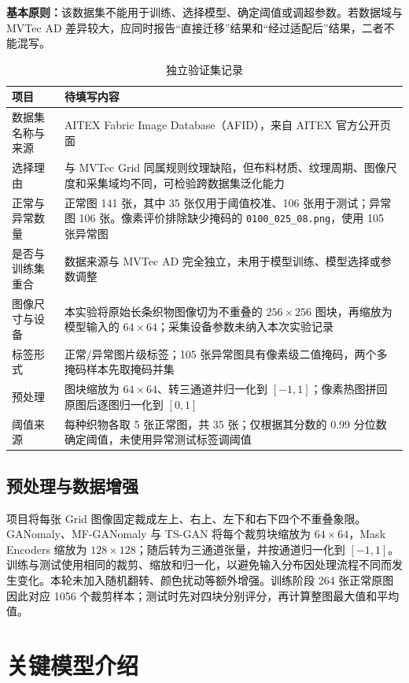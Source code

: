 \documentclass[UTF8,12pt]{ctexart}
\begin{document}
\noindent\textbf{基本原则：}该数据集不能用于训练、选择模型、确定阈值或调超参数。若数据域与 MVTec AD 差异较大，应同时报告“直接迁移”结果和“经过适配后”结果，二者不能混写。

\begin{table}[H]
\centering
\caption{独立验证集记录}
\begin{tabularx}{\linewidth}{L{3.1cm}Y}
\toprule
\textbf{项目} & \textbf{待填写内容} \\
\midrule
数据集名称与来源 & AITEX Fabric Image Database（AFID），来自 AITEX 官方公开页面 \\
选择理由 & 与 MVTec Grid 同属规则纹理缺陷，但布料材质、纹理周期、图像尺度和采集域均不同，可检验跨数据集泛化能力 \\
正常与异常数量 & 正常图 141 张，其中 35 张仅用于阈值校准、106 张用于测试；异常图 106 张。像素评价排除缺少掩码的 \texttt{0100\_025\_08.png}，使用 105 张异常图 \\
是否与训练集重合 & 数据来源与 MVTec AD 完全独立，未用于模型训练、模型选择或参数调整 \\
图像尺寸与设备 & 本实验将原始长条织物图像切为不重叠的 $256\times256$ 图块，再缩放为模型输入的 $64\times64$；采集设备参数未纳入本次实验记录 \\
标签形式 & 正常/异常图片级标签；105 张异常图具有像素级二值掩码，两个多掩码样本先取掩码并集 \\
预处理 & 图块缩放为 $64\times64$、转三通道并归一化到 $[-1,1]$；像素热图拼回原图后逐图归一化到 $[0,1]$ \\
阈值来源 & 每种织物各取 5 张正常图，共 35 张；仅根据其分数的 0.99 分位数确定阈值，未使用异常测试标签调阈值 \\
\bottomrule
\end{tabularx}
\end{table}

\subsection{预处理与数据增强}

项目将每张 Grid 图像固定裁成左上、右上、左下和右下四个不重叠象限。GANomaly、MF-GANomaly 与 TS-GAN 将每个裁剪块缩放为 $64\times64$，Mask Encoders 缩放为 $128\times128$；随后转为三通道张量，并按通道归一化到 $[-1,1]$。训练与测试使用相同的裁剪、缩放和归一化，以避免输入分布因处理流程不同而发生变化。本轮未加入随机翻转、颜色扰动等额外增强。训练阶段 264 张正常原图因此对应 1056 个裁剪样本；测试时先对四块分别评分，再计算整图最大值和平均值。

\section{关键模型介绍}
\end{document}
